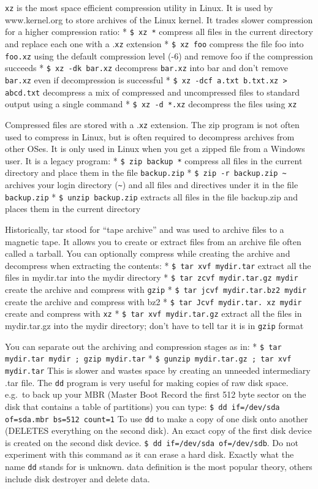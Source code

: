 \texttt{xz} is the most space efficient compression utility in Linux. It
is used by www.kernel.org to store archives of the Linux kernel. It
trades slower compression for a higher compression ratio: *
\texttt{\$ xz *} compress all files in the current directory and replace
each one with a .\texttt{xz} extension * \texttt{\$ xz foo} compress the
file foo into \texttt{foo.xz} using the default compression level (-6)
and remove foo if the compression succeeds * \texttt{\$ xz -dk bar.xz}
decompress \texttt{bar.xz} into bar and don't remove \texttt{bar.xz}
even if decompression is successful *
\texttt{\$ xz -dcf a.txt b.txt.xz \textgreater{} abcd.txt} decompress a
mix of compressed and uncompressed files to standard output using a
single command * \texttt{\$ xz -d *.xz} decompress the files using
\texttt{xz}

Compressed files are stored with a .\texttt{xz} extension. The zip
program is not often used to compress in Linux, but is often required to
decompress archives from other OSes. It is only used in Linux when you
get a zipped file from a Windows user. It is a legacy program: *
\texttt{\$ zip backup *} compress all files in the current directory and
place them in the file \texttt{backup.zip} *
\texttt{\$ zip -r backup.zip \textasciitilde{}} archives your login
directory (\texttt{\textasciitilde{}}) and all files and directives
under it in the file \texttt{backup.zip} * \texttt{\$ unzip backup.zip}
extracts all files in the file backup.zip and places them in the current
directory

Historically, tar stood for ``tape archive'' and was used to archive
files to a magnetic tape. It allows you to create or extract files from
an archive file often called a tarball. You can optionally compress
while creating the archive and decompress when extracting the contents:
* \texttt{\$ tar xvf mydir.tar} extract all the files in mydir.tar into
the mydir directory * \texttt{\$ tar zcvf mydir.tar.gz mydir} create the
archive and compress with \texttt{gzip} *
\texttt{\$ tar jcvf mydir.tar.bz2 mydir} create the archive and compress
with bz2 * \texttt{\$ tar Jcvf mydir.tar. xz mydir} create and compress
with \texttt{xz} * \texttt{\$ tar xvf mydir.tar.gz} extract all the
files in mydir.tar.gz into the mydir directory; don't have to tell tar
it is in \texttt{gzip} format

You can separate out the archiving and compression stages as in: *
\texttt{\$ tar mydir.tar mydir ; gzip mydir.tar} *
\texttt{\$ gunzip mydir.tar.gz ; tar xvf mydir.tar} This is slower and
wastes space by creating an unneeded intermediary .tar file. The
\texttt{dd} program is very useful for making copies of raw disk space.
e.g.~to back up your MBR (Master Boot Record the first 512 byte sector
on the disk that contains a table of partitions) you can type:
\texttt{\$ dd if=/dev/sda of=sda.mbr bs=512 count=1} To use \texttt{dd}
to make a copy of one disk onto another (DELETES everything on the
second disk). An exact copy of the first disk device is created on the
second disk device. \texttt{\$ dd if=/dev/sda of=/dev/sdb}. Do not
experiment with this command as it can erase a hard disk. Exactly what
the name \texttt{dd} stands for is unknown. data definition is the most
popular theory, others include disk destroyer and delete data.

